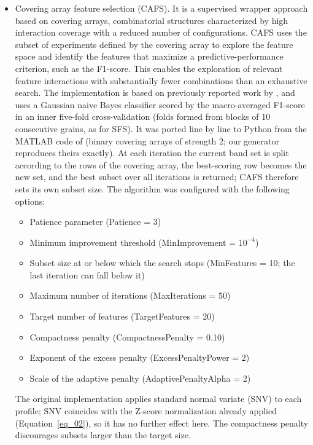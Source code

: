 \documentclass[final,5p,times,twocolumn]{elsarticle}
\newcommand{\added}[1]{#1}
\begin{document}
\begin{itemize}
    \item[--] Covering array feature selection (CAFS).
    It is a supervised wrapper approach based on covering arrays, combinatorial structures characterized by high interaction coverage with a reduced number of configurations. 
    CAFS uses the subset of experiments defined by the covering array to explore the feature space and identify the features that maximize a predictive-performance criterion, such as the F1-score.
    This enables the exploration of relevant feature interactions with substantially fewer combinations than an exhaustive search.
    The implementation is based on previously reported work by \citet{Castro2022cafs}, and uses a Gaussian naive Bayes classifier scored by the macro-averaged F1-score in an inner five-fold cross-validation \added{(folds formed from blocks of 10 consecutive grains, as for SFS)}. \added{It was ported line by line to Python from the MATLAB code of \citet{Castro2022cafs} (binary covering arrays of strength 2; our generator reproduces theirs exactly). At each iteration the current band set is split according to the rows of the covering array, the best-scoring row becomes the new set, and the best subset over all iterations is returned; CAFS therefore sets its own subset size.}
    The algorithm was configured with the following options: 
    \begin{itemize}
        \item  Patience parameter (Patience = 3)
        \item  Minimum improvement threshold (MinImprovement = $10^{-4}$)
        \item  Subset size at or below which the search stops (MinFeatures = 10; the last iteration can fall below it) 
        \item  Maximum number of iterations (MaxIterations = 50)
        \item  Target number of features (TargetFeatures = 20)
        \item  Compactness penalty (CompactnessPenalty = 0.10)
        \item  Exponent of the excess penalty (ExcessPenaltyPower = 2)
        \item  Scale of the adaptive penalty (AdaptivePenaltyAlpha = 2)
    \end{itemize}

     The original implementation applies standard normal variate (SNV) to each profile; SNV coincides with the Z-score normalization already applied (Equation~\ref{eq_02}), so it has no further effect here. The compactness penalty discourages subsets larger than the target size.
        
\end{itemize}
\end{document}
